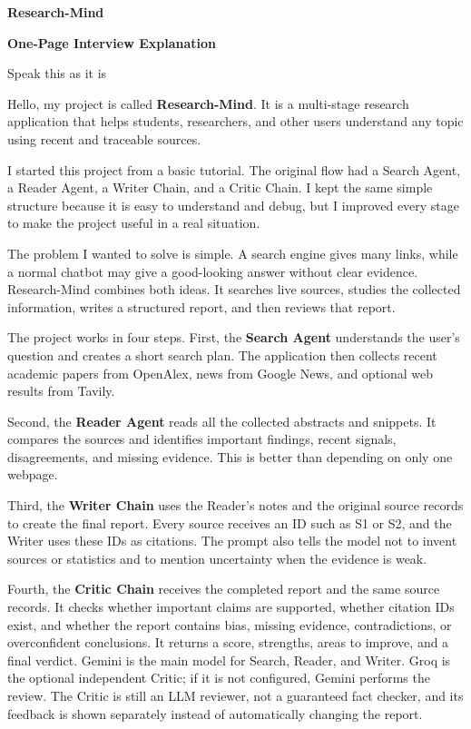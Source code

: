 \documentclass[11pt,a4paper]{article}
\begin{document}
\begin{center}
  {\LARGE\color{Ink}\bfseries Research-Mind}\par
  \vspace{1mm}
  {\large\color{Brand}\bfseries One-Page Interview Explanation}\par
  \vspace{1mm}
  {\small\color{Muted}Speak this as it is}
\end{center}

\begin{tcolorbox}[colback=Soft,colframe=Brand,boxrule=.7pt,arc=2mm,left=3mm,right=3mm,top=2mm,bottom=2mm]
Hello, my project is called \textbf{Research-Mind}. It is a multi-stage research application that helps students, researchers, and other users understand any topic using recent and traceable sources.

I started this project from a basic tutorial. The original flow had a Search Agent, a Reader Agent, a Writer Chain, and a Critic Chain. I kept the same simple structure because it is easy to understand and debug, but I improved every stage to make the project useful in a real situation.

The problem I wanted to solve is simple. A search engine gives many links, while a normal chatbot may give a good-looking answer without clear evidence. Research-Mind combines both ideas. It searches live sources, studies the collected information, writes a structured report, and then reviews that report.

The project works in four steps. First, the \textbf{Search Agent} understands the user's question and creates a short search plan. The application then collects recent academic papers from OpenAlex, news from Google News, and optional web results from Tavily.

Second, the \textbf{Reader Agent} reads all the collected abstracts and snippets. It compares the sources and identifies important findings, recent signals, disagreements, and missing evidence. This is better than depending on only one webpage.

Third, the \textbf{Writer Chain} uses the Reader's notes and the original source records to create the final report. Every source receives an ID such as S1 or S2, and the Writer uses these IDs as citations. The prompt also tells the model not to invent sources or statistics and to mention uncertainty when the evidence is weak.

Fourth, the \textbf{Critic Chain} receives the completed report and the same source records. It checks whether important claims are supported, whether citation IDs exist, and whether the report contains bias, missing evidence, contradictions, or overconfident conclusions. It returns a score, strengths, areas to improve, and a final verdict. Gemini is the main model for Search, Reader, and Writer. Groq is the optional independent Critic; if it is not configured, Gemini performs the review. The Critic is still an LLM reviewer, not a guaranteed fact checker, and its feedback is shown separately instead of automatically changing the report.


\end{tcolorbox}
\end{document}
